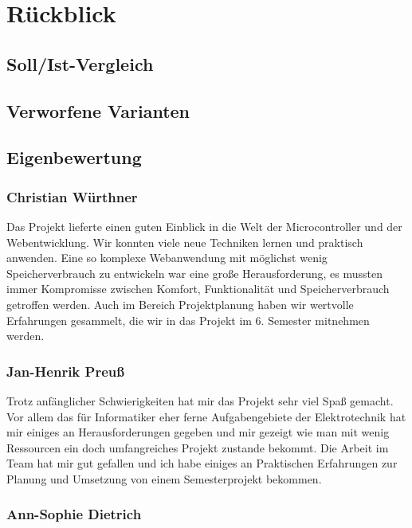 \chapter{Rückblick}

\section{Soll/Ist-Vergleich}

\section{Verworfene Varianten}

\section{Eigenbewertung}


\subsection*{Christian Würthner}
Das Projekt lieferte einen guten Einblick in die Welt der Microcontroller und
der Webentwicklung. Wir konnten viele neue Techniken lernen und praktisch
anwenden. Eine so komplexe Webanwendung mit möglichst wenig Speicherverbrauch zu
entwickeln war eine große Herausforderung, es mussten immer Kompromisse zwischen
Komfort, Funktionalität und Speicherverbrauch getroffen werden. Auch im Bereich
Projektplanung haben wir wertvolle Erfahrungen gesammelt, die wir in das Projekt
im 6. Semester mitnehmen werden.

\subsection*{Jan-Henrik Preuß}
Trotz anfänglicher Schwierigkeiten hat mir das Projekt sehr viel Spaß gemacht.
Vor allem das für Informatiker eher ferne Aufgabengebiete der Elektrotechnik hat
mir einiges an Herausforderungen gegeben und mir gezeigt wie man mit wenig
Ressourcen ein doch umfangreiches Projekt zustande bekommt. Die Arbeit im Team 
hat mir gut gefallen und ich habe einiges an Praktischen Erfahrungen zur Planung
und Umsetzung von einem Semesterprojekt bekommen.

\subsection*{Ann-Sophie Dietrich}

